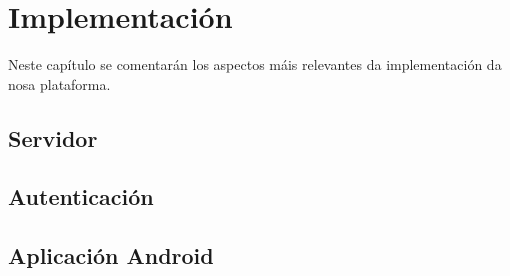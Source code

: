 \chapter{Implementación}

Neste capítulo se comentarán los aspectos máis relevantes da implementación da nosa plataforma.



\section{Servidor}


\section{Autenticación}


\section{Aplicación Android}


